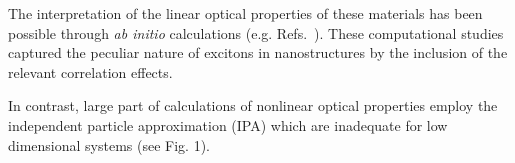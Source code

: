 The interpretation of the linear optical properties of these materials has been possible through \emph{ab initio} calculations (e.g. Refs.~\cite{molina2013effect,PhysRevLett.100.189701}). These computational studies captured the peculiar nature of excitons in nanostructures\cite{scholes2006excitons} by the inclusion of the relevant correlation effects.

In contrast, large part of calculations of nonlinear optical properties employ the independent particle approximation\cite{guo2005second,margulis2013optical} (IPA) which are inadequate for low dimensional systems (see Fig. 1).\cite{scholes2006excitons} 


